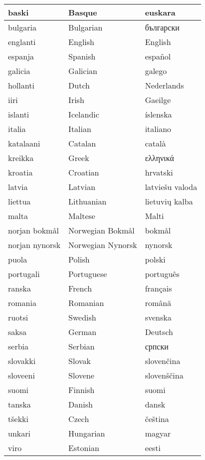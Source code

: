 \documentclass{../../metanetpaper}
\begin{document}
 \begin{tabular}{l|l|l}
 \hline baski & Basque & euskara\\
 \hline bulgaria & Bulgarian & български\\
 \hline englanti & English & English\\
 \hline espanja & Spanish & español\\
 \hline galicia & Galician & galego\\
 \hline hollanti & Dutch & Nederlands\\
 \hline iiri & Irish & Gaeilge\\
 \hline islanti & Icelandic & íslenska\\
 \hline italia & Italian & italiano\\
 \hline katalaani & Catalan & català\\
 \hline kreikka & Greek & ελληνικά\\
 \hline kroatia & Croatian & hrvatski\\
 \hline latvia & Latvian & latviešu valoda\\
 \hline liettua & Lithuanian & lietuvių kalba\\
 \hline malta & Maltese & Malti\\
 \hline norjan bokmål & Norwegian Bokmål & bokmål\\
 \hline norjan nynorsk & Norwegian Nynorsk & nynorsk\\
 \hline puola & Polish & polski\\
 \hline portugali & Portuguese & português\\
 \hline ranska & French & français\\
 \hline romania & Romanian & română\\
 \hline ruotsi & Swedish & svenska\\
 \hline saksa & German & Deutsch\\
 \hline serbia & Serbian & српски\\
 \hline slovakki & Slovak & slovenčina\\
 \hline sloveeni & Slovene & slovenščina\\
 \hline suomi & Finnish & suomi\\
 \hline tanska & Danish & dansk\\
 \hline tšekki & Czech & čeština\\
 \hline unkari & Hungarian & magyar\\
 \hline viro & Estonian & eesti\\
 \end{tabular}
\end{document}
